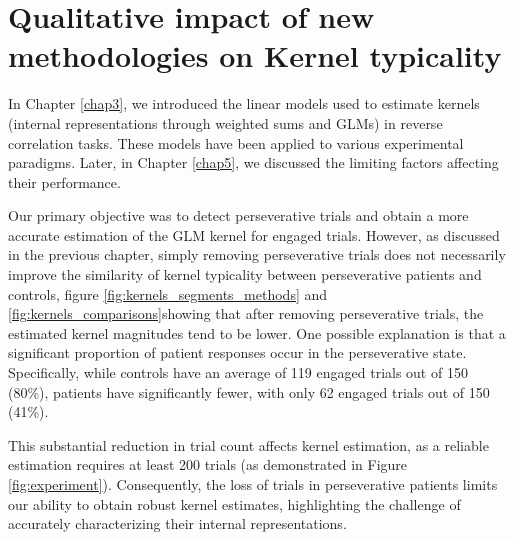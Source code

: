 \section{Qualitative impact of new methodologies on Kernel typicality}

In Chapter \ref{chap3}, we introduced the linear models used to estimate kernels (internal representations through weighted sums and GLMs) in reverse correlation tasks. These models have been applied to various experimental paradigms. Later, in Chapter \ref{chap5}, we discussed the limiting factors affecting their performance.

Our primary objective was to detect perseverative trials and obtain a more accurate estimation of the GLM kernel for engaged trials. However, as discussed in the previous chapter, simply removing perseverative trials does not necessarily improve the similarity of kernel typicality between perseverative patients and controls, figure \ref{fig:kernels_segments_methods} and \ref{fig:kernels_comparisons}showing that after removing perseverative trials, the estimated kernel magnitudes tend to be lower. One possible explanation is that a significant proportion of patient responses occur in the perseverative state. Specifically, while controls have an average of 119 engaged trials out of 150 (80\%), patients have significantly fewer, with only 62 engaged trials out of 150 (41\%).

This substantial reduction in trial count affects kernel estimation, as a reliable estimation requires at least 200 trials (as demonstrated in Figure \ref{fig:experiment}). Consequently, the loss of trials in perseverative patients limits our ability to obtain robust kernel estimates, highlighting the challenge of accurately characterizing their internal representations.


